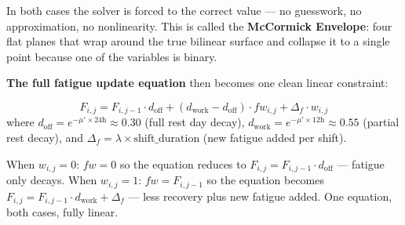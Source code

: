 \documentclass[12pt,a4paper]{article}
\begin{document}
In both cases the solver is forced to the correct value — no guesswork, no approximation, no nonlinearity. This is called the \textbf{McCormick Envelope}: four flat planes that wrap around the true bilinear surface and collapse it to a single point because one of the variables is binary.

\vspace{6pt}
\textbf{The full fatigue update equation} then becomes one clean linear constraint:

\begin{eqbox}
\begin{equation}
  F_{i,j} = F_{i,j-1} \cdot d_{\text{off}}
           + (d_{\text{work}} - d_{\text{off}}) \cdot fw_{i,j}
           + \Delta_f \cdot w_{i,j}
\end{equation}
where $d_{\text{off}} = e^{-\mu' \times 24\text{h}} \approx 0.30$ (full rest day decay),
$d_{\text{work}} = e^{-\mu' \times 12\text{h}} \approx 0.55$ (partial rest decay),
and $\Delta_f = \lambda \times \text{shift\_duration}$ (new fatigue added per shift).
\end{eqbox}

When $w_{i,j}=0$: $fw=0$ so the equation reduces to $F_{i,j} = F_{i,j-1} \cdot d_{\text{off}}$ — fatigue only decays. When $w_{i,j}=1$: $fw=F_{i,j-1}$ so the equation becomes $F_{i,j} = F_{i,j-1} \cdot d_{\text{work}} + \Delta_f$ — less recovery plus new fatigue added. One equation, both cases, fully linear.
\end{document}

